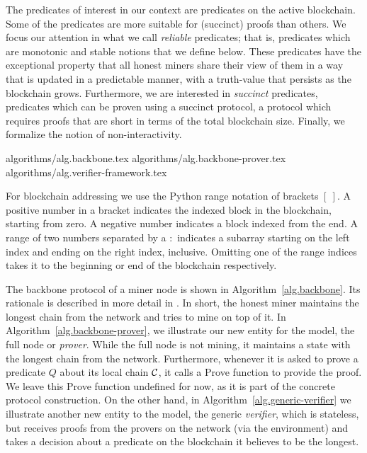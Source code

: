 The predicates of interest in our context are predicates on the active blockchain. 
Some of the predicates are more suitable for (succinct) proofs than others. We focus
our attention in what we call \textit{reliable} predicates; that is,
predicates which are monotonic and stable notions that we define below.  
These predicates have the
exceptional property that all honest miners share their view of them in a way
that is updated in a predictable manner, with a truth-value that persists as the
blockchain grows.  Furthermore, we are interested in \textit{succinct}
predicates, predicates which can be proven using a succinct protocol, a
protocol which requires proofs that are short in terms of the total blockchain
size. Finally, we formalize the notion of non-interactivity.


{algorithms/alg.backbone.tex}
{algorithms/alg.backbone-prover.tex}
{algorithms/alg.verifier-framework.tex}

For blockchain addressing we use the Python range notation of brackets $[~]$.
A positive number in a bracket indicates the indexed block in the blockchain,
starting from zero. A negative number indicates a block indexed from the end. A
range of two numbers separated by a $:$ indicates a subarray starting on the
left index and ending on the right index, inclusive. Omitting one of the range
indices takes it to the beginning or end of the blockchain respectively.

The backbone protocol of a miner node is shown in Algorithm~\ref{alg.backbone}.
Its rationale is described in more detail in \cite{backbone}. In short, the
honest miner maintains the longest chain from the network and tries to mine on
top of it. In Algorithm~\ref{alg.backbone-prover}, we illustrate our new entity
for the model, the full node or \textit{prover}. While the full node is not
mining, it maintains a state with the longest chain from the network.
Furthermore, whenever it is asked to prove a predicate $Q$ about its local
chain $\mathcal{C}$, it calls a Prove function to provide the proof. We leave this
Prove function undefined for now, as it is part of the concrete protocol
construction. On the other hand, in Algorithm~\ref{alg.generic-verifier} we
illustrate another new entity to the model, the generic \textit{verifier},
which is stateless, but receives proofs from the provers on the network (via
the environment) and takes a decision about a predicate on the blockchain it
believes to be the longest.

